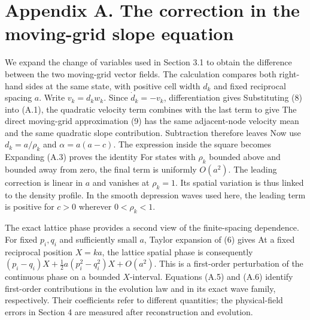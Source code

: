 \FloatBarrier
\section*{Appendix A. The correction in the moving-grid slope equation}
\label{app:correction}

We expand the change of variables used in Section 3.1 to obtain the difference between the two moving-grid vector fields. The calculation compares both right-hand sides at the same state, with positive cell width \(d_k\) and fixed reciprocal spacing \(a\). Write \(v_k=d_kw_k\). Since \(\dot d_k=-v_k\), differentiation gives
Substituting (8) into (A.1), the quadratic velocity term combines with the last term to give
The direct moving-grid approximation (9) has the same adjacent-node velocity mean and the same quadratic slope contribution. Subtraction therefore leaves
Now use \(d_k=a/\rho_k\) and \(\alpha=a(a-c)\). The expression inside the square becomes
Expanding (A.3) proves the identity
For states with \(\rho_k\) bounded above and bounded away from zero, the final term is uniformly \(O(a^2)\). The leading correction is linear in \(a\) and vanishes at \(\rho_k=1\). Its spatial variation is thus linked to the density profile. In the smooth depression waves used here, the leading term is positive for \(c>0\) wherever \(0<\rho_k<1\).

The exact lattice phase provides a second view of the finite-spacing dependence. For fixed \(p_i,q_i\) and sufficiently small \(a\), Taylor expansion of (6) gives
At a fixed reciprocal position \(X=ka\), the lattice spatial phase is consequently \((p_i-q_i)X+\tfrac12a(p_i^2-q_i^2)X+O(a^2)\). This is a first-order perturbation of the continuous phase on a bounded \(X\)-interval. Equations (A.5) and (A.6) identify first-order contributions in the evolution law and in its exact wave family, respectively. Their coefficients refer to different quantities; the physical-field errors in Section 4 are measured after reconstruction and evolution.

